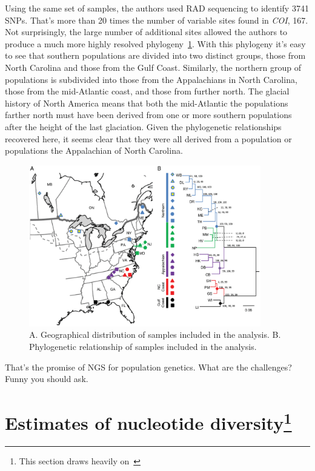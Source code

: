 Using the same set of samples, the authors used RAD sequencing to
identify 3741 SNPs. That's more than 20 times the number of variable
sites found in {\it COI}, 167. Not surprisingly, the large number of
additional sites allowed the authors to produce a much more highly
resolved phylogeny~\ref{fig:wyeomyia-RAD}. With this phylogeny it's
easy to see that southern populations are divided into two distinct
groups, those from North Carolina and those from the Gulf
Coast. Similarly, the northern group of populations is subdivided into
those from the Appalachians in North Carolina, those from the
mid-Atlantic coast, and those from further north. The glacial history
of North America means that both the mid-Atlantic the populations
farther north must have been derived from one or more southern
populations after the height of the last glaciation. Given the
phylogenetic relationships recovered here, it seems clear that they
were all derived from a population or populations the Appalachian of
North Carolina.

\begin{figure}
\begin{center}
\includegraphics[width=0.9\textwidth]{wyeomyia-RAD.eps}
\end{center}
\caption{A. Geographical distribution of samples included in the
  analysis. B. Phylogenetic relationship of samples included in the analysis.}\label{fig:wyeomyia-RAD}
\end{figure}

That's the promise of NGS for population genetics. What are the
challenges? Funny you should ask.

\section*{Estimates of nucleotide diversity\footnote{This section draws heavily on~\cite{Lynch-2008}}}

